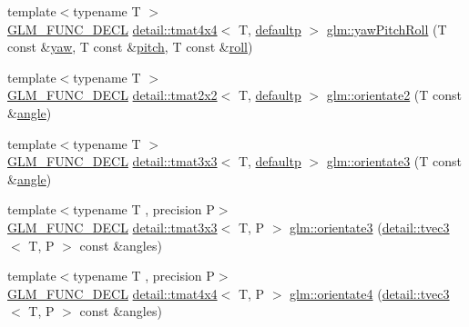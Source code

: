 \begin{DoxyCompactItemize}
\item 
{\footnotesize template$<$typename T $>$ }\\\hyperlink{setup_8hpp_ab2d052de21a70539923e9bcbf6e83a51}{G\+L\+M\+\_\+\+F\+U\+N\+C\+\_\+\+D\+E\+CL} \hyperlink{structglm_1_1detail_1_1tmat4x4}{detail\+::tmat4x4}$<$ T, \hyperlink{namespaceglm_a0f04f086094c747d227af4425893f545a9d21ccd8b5a009ec7eb7677befc3bf51}{defaultp} $>$ \hyperlink{group__gtx__euler__angles_gaf6f927d06835272cd6a61ee3f8f65f5e}{glm\+::yaw\+Pitch\+Roll} (T const \&\hyperlink{group__gtc__quaternion_ga1de7653ddf380ff06d2300eea831664c}{yaw}, T const \&\hyperlink{group__gtc__quaternion_ga4d345dc369a54f53f5ebc375bac56d11}{pitch}, T const \&\hyperlink{group__gtc__quaternion_ga6d883e423bc425f4334fcce202131f7e}{roll})
\item 
{\footnotesize template$<$typename T $>$ }\\\hyperlink{setup_8hpp_ab2d052de21a70539923e9bcbf6e83a51}{G\+L\+M\+\_\+\+F\+U\+N\+C\+\_\+\+D\+E\+CL} \hyperlink{structglm_1_1detail_1_1tmat2x2}{detail\+::tmat2x2}$<$ T, \hyperlink{namespaceglm_a0f04f086094c747d227af4425893f545a9d21ccd8b5a009ec7eb7677befc3bf51}{defaultp} $>$ \hyperlink{group__gtx__euler__angles_gab39476f0decc117783e02ba389a04ee7}{glm\+::orientate2} (T const \&\hyperlink{group__gtc__quaternion_ga23a3fc7ada5bbb665ff84c92c6e0542c}{angle})
\item 
{\footnotesize template$<$typename T $>$ }\\\hyperlink{setup_8hpp_ab2d052de21a70539923e9bcbf6e83a51}{G\+L\+M\+\_\+\+F\+U\+N\+C\+\_\+\+D\+E\+CL} \hyperlink{structglm_1_1detail_1_1tmat3x3}{detail\+::tmat3x3}$<$ T, \hyperlink{namespaceglm_a0f04f086094c747d227af4425893f545a9d21ccd8b5a009ec7eb7677befc3bf51}{defaultp} $>$ \hyperlink{group__gtx__euler__angles_ga2c94907d441c40beb413fe3284c1b267}{glm\+::orientate3} (T const \&\hyperlink{group__gtc__quaternion_ga23a3fc7ada5bbb665ff84c92c6e0542c}{angle})
\item 
{\footnotesize template$<$typename T , precision P$>$ }\\\hyperlink{setup_8hpp_ab2d052de21a70539923e9bcbf6e83a51}{G\+L\+M\+\_\+\+F\+U\+N\+C\+\_\+\+D\+E\+CL} \hyperlink{structglm_1_1detail_1_1tmat3x3}{detail\+::tmat3x3}$<$ T, P $>$ \hyperlink{group__gtx__euler__angles_gab6a2a986916647ddedc94bbd2516f20c}{glm\+::orientate3} (\hyperlink{structglm_1_1detail_1_1tvec3}{detail\+::tvec3}$<$ T, P $>$ const \&angles)
\item 
{\footnotesize template$<$typename T , precision P$>$ }\\\hyperlink{setup_8hpp_ab2d052de21a70539923e9bcbf6e83a51}{G\+L\+M\+\_\+\+F\+U\+N\+C\+\_\+\+D\+E\+CL} \hyperlink{structglm_1_1detail_1_1tmat4x4}{detail\+::tmat4x4}$<$ T, P $>$ \hyperlink{group__gtx__euler__angles_ga3b9f62da9726cdad708df41712792082}{glm\+::orientate4} (\hyperlink{structglm_1_1detail_1_1tvec3}{detail\+::tvec3}$<$ T, P $>$ const \&angles)
\end{DoxyCompactItemize}


